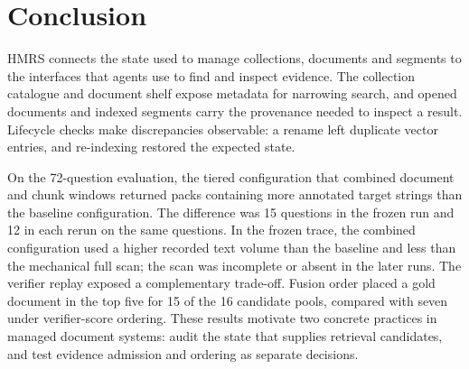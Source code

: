 \section{Conclusion}
\label{sec:conclusion}

HMRS connects the state used to manage collections, documents and segments
to the interfaces that agents use to find and inspect evidence. The
collection catalogue and document shelf expose metadata for narrowing
search, and opened documents and indexed segments carry the provenance
needed to inspect a result. Lifecycle checks make discrepancies observable:
a rename left duplicate vector entries, and re-indexing restored the expected
state.

On the 72-question evaluation, the tiered configuration that combined
document and chunk windows returned packs containing more annotated target
strings than the baseline configuration. The difference was 15 questions in the
frozen run and 12 in each rerun on the same questions.
In the frozen trace, the combined configuration used a higher recorded text
volume than the baseline and less than the mechanical full scan; the scan was
incomplete or absent in the later runs. The verifier
replay exposed a complementary trade-off. Fusion order placed a gold
document in the top five for 15 of the 16 candidate pools, compared with
seven under verifier-score ordering.
These results motivate two concrete practices in managed document systems:
audit the state that supplies retrieval candidates, and test evidence
admission and ordering as separate decisions.
